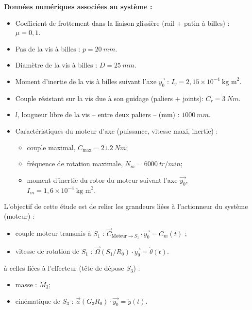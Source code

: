 \documentclass[10pt,fleqn]{article} %
\begin{document}
\begin{multicols}{2}
\textbf{Données numériques associées au système :}
\begin{itemize}
\item Coefficient de frottement dans la liaison glissière (rail + patin à billes) : $\mu = 0,1$.
\item Pas de la vis à billes : $p = \SI{20}{mm}$.
\item Diamètre de la vis à billes : $D =\SI{25}{mm}$.
\item Moment d'inertie de la vis à billes suivant l'axe $\overrightarrow{y_0}$ : $I_v = 2,15 \times 10^{-4}\;\text{kg m}^2$.
\item Couple résistant sur la vis due à son guidage (paliers + joints): $C_r = \SI{3}{Nm}$.
\item $l$, longueur libre de la vis -- entre deux paliers -- (mm) : $\SI{1000}{mm}$.
\item Caractéristiques du moteur d'axe (puissance, vitesse maxi, inertie) :
\begin{itemize}
\item couple maximal, $C_{\text{max}} = \SI{21,2}{Nm}$;
\item fréquence de rotation maximale, $N_m = \SI{6000}{tr/min}$;
\item moment d'inertie du rotor du moteur suivant l'axe $\overrightarrow{y_0}$, $I_m = 1,6 \times 10^{-4}\;\text{kg m}^2$.
\end{itemize}

\end{itemize}

\begin{obj}
L'objectif de cette étude est de relier les grandeurs liées à l'actionneur du système (moteur) :
\begin{itemize}
\item couple moteur transmis à $S_1$ : $\overrightarrow{C}_{\text{Moteur}\to S_1}\cdot \overrightarrow{y_0}=C_m(t)$ ;
\item vitesse de rotation de $S_1$ : $\overrightarrow{\Omega}(S_1/R_0)\cdot \overrightarrow{y_0}=\dot{\theta}(t)$.
\end{itemize} 
à celles liées à l'effecteur (tête de dépose $S_3$) : 
\begin{itemize}
\item masse : $M_3$;
\item cinématique de $S_3$ : $\overrightarrow{a}(G_3R_0)\cdot \overrightarrow{y_0}=\ddot{y}(t)$.
\end{itemize}
\end{obj}




\end{multicols}
\end{document}
